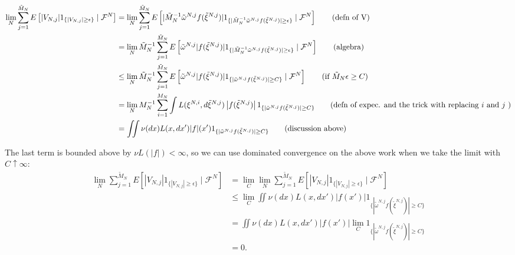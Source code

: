 \documentclass{article}
\begin{document}
\begin{align*}
\lim_N \sum_{j=1}^{\tilde{M}_N} E\left[ |V_{N,j}| 1_{\{|V_{N,j}| \ge \epsilon \} } \mid \mathcal{F}^N\right] 
&= \lim_N \sum_{j=1}^{\tilde{M}_N} E\left[ |\tilde{M}_N^{-1} \tilde{\omega}^{N,j} f(\tilde{\xi}^{N,j})| 1_{\{|\tilde{M}_N^{-1} \tilde{\omega}^{N,j} f(\tilde{\xi}^{N,j})| \ge \epsilon \} } \mid \mathcal{F}^N\right] \tag{defn of V}\\
&= \lim_N \tilde{M}_N^{-1}\sum_{j=1}^{\tilde{M}_N} E\left[\tilde{\omega}^{N,j} |  f(\tilde{\xi}^{N,j})| 1_{\{|\tilde{M}_N^{-1} \tilde{\omega}^{N,j} f(\tilde{\xi}^{N,j})| \ge \epsilon \} } \mid \mathcal{F}^N\right] \tag{algebra} \\
&\le \lim_N \tilde{M}_N^{-1}\sum_{j=1}^{\tilde{M}_N} E\left[ \tilde{\omega}^{N,j}|  f(\tilde{\xi}^{N,j})| 1_{\{| \tilde{\omega}^{N,j} f(\tilde{\xi}^{N,j})| \ge C \} } \mid \mathcal{F}^N\right] \tag{if $\tilde{M}_N \epsilon \ge C$} \\
&= \lim_N M_N^{-1}\sum_{i=1}^{M_N} \int L(\xi^{N,i}, d \tilde{\xi}^{N,j}) \left|f(\tilde{\xi}^{N,j})\right| 1_{\{| \tilde{\omega}^{N,j} f(\tilde{\xi}^{N,j})| \ge C \} }  \tag{defn of expec. and the trick with replacing $i$ and $j$ }\\
&= \iint \nu(dx) L(x, d x') |f|(x') 1_{\{| \tilde{\omega}^{N,j} f(\tilde{\xi}^{N,j})| \ge C \} }  \tag{discussion above}\\
\end{align*}


The last term is bounded above by $\nu L(|f|) <\infty$, so we can use dominated convergence on the above work when we take the limit with $C \uparrow \infty$:
\begin{align*}
\lim_N \sum_{j=1}^{\tilde{M}_N} E\left[ |V_{N,j}| 1_{\{|V_{N,j}| \ge \epsilon \} } \mid \mathcal{F}^N\right] &=
\lim_C \lim_N \sum_{j=1}^{\tilde{M}_N} E\left[ |V_{N,j}| 1_{\{|V_{N,j}| \ge \epsilon \} } \mid \mathcal{F}^N\right] \\ 
&\le \lim_C \iint \nu(dx) L(x, d x') \left|f(x')\right| 1_{\{| \tilde{\omega}^{N,j} f(\tilde{\xi}^{N,j})| \ge C \} }  \tag{above} \\
&=  \iint \nu(dx) L(x, d x') \left|f(x')\right| \lim_C 1_{\{| \tilde{\omega}^{N,j} f(\tilde{\xi}^{N,j})| \ge C \} }  \tag{DCT}\\
&=  0.
\end{align*}
\end{document}
